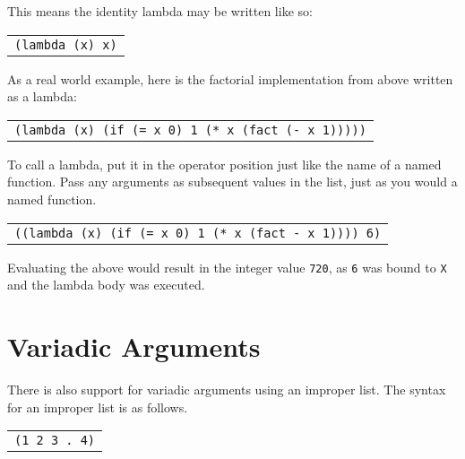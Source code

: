 \documentclass[
letterpaper,
oneside,
]{memoir}
\begin{document}
\vspace{1em}
\noindent
This means the identity lambda may be written like so:

\vspace{1em}
\begin{tabular}{l}
  \texttt{(lambda (x) x)} \\
\end{tabular}
\vspace{1em}

\filbreak

\noindent
As a real world example, here is the factorial implementation from above written as a lambda:

\vspace{1em}
\begin{tabular}{l}
  \texttt{(lambda (x) (if (= x 0) 1 (* x (fact (- x 1)))))} \\
\end{tabular}
\vspace{1em}

\filbreak

\noindent
To call a lambda, put it in the operator position just like the name of a named function. Pass any arguments as subsequent values in the list, just as you would a named function.

\vspace{1em}
\begin{tabular}{l}
  \texttt{((lambda (x) (if (= x 0) 1 (* x (fact - x 1)))) 6)} \\
\end{tabular}
\vspace{1em}

\noindent
Evaluating the above would result in the integer value \texttt{720}, as \texttt{6} was bound to \texttt{X} and the lambda body was executed.

\filbreak

\section{Variadic Arguments}

There is also support for variadic arguments using an improper list. The syntax for an improper list is as follows.

\vspace{1em}
\begin{tabular}{l}
  \texttt{(1 2 3 . 4)} \\
\end{tabular}
\vspace{1em}
\end{document}
